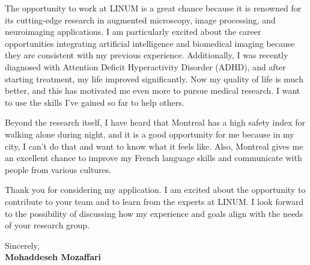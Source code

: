 \documentclass[letterpaper,11pt]{letter}
\begin{document}
The opportunity to work at LINUM is a great chance because it is renowned for its cutting-edge research in augmented microscopy, image processing, and neuroimaging applications. I am particularly excited about the career opportunities integrating artificial intelligence and biomedical imaging because they are consistent with my previous experience.
Additionally, I was recently diagnosed with Attention Deficit Hyperactivity Disorder (ADHD), and after starting treatment, my life improved significantly. Now my quality of life is much better, and this has motivated me even more to pursue medical research. I want to use the skills I’ve gained so far to help others.


Beyond the research itself, I have heard that Montreal has a high safety index for walking alone during night, and it is a good opportunity for me because in my city, I can't do that and want to know what it feels like. Also, Montreal gives me an excellent chance to improve my French language skills and communicate with people from various cultures.


Thank you for considering my application. I am excited about the opportunity to contribute to your team and to learn from the experts at LINUM. I look forward to the possibility of discussing how my experience and goals align with the needs of your research group.


\begin{flushleft}
    Sincerely, \\
    \textbf{Mohaddeseh Mozaffari}
\end{flushleft}
\end{document}
